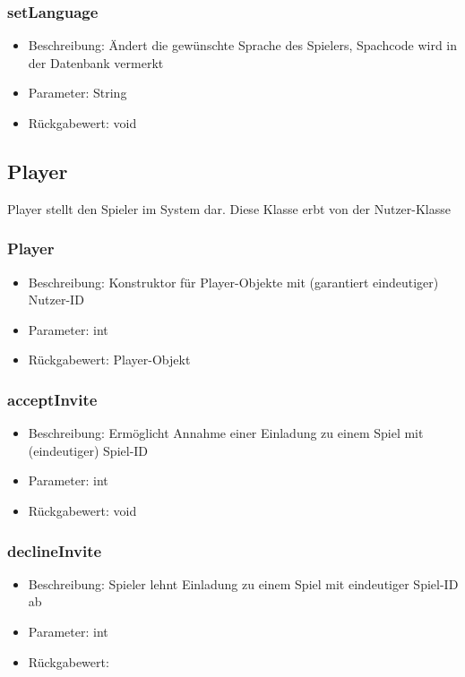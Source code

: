 \documentclass[a4paper]{scrreprt}
\begin{document}
    \subsubsection{setLanguage}
    \begin{itemize}
        \item Beschreibung: Ändert die gewünschte Sprache des Spielers, Spachcode wird in der Datenbank vermerkt
        \item Parameter: String
        \item Rückgabewert: void
    \end{itemize}

    \subsection{Player}
    Player stellt den Spieler im System dar. Diese Klasse erbt von der Nutzer-Klasse
    \subsubsection{Player}
    \begin{itemize}
        \item Beschreibung: Konstruktor für Player-Objekte mit (garantiert eindeutiger) Nutzer-ID
        \item Parameter: int
        \item Rückgabewert: Player-Objekt
    \end{itemize}
    \subsubsection{acceptInvite}
    \begin{itemize}
        \item Beschreibung: Ermöglicht Annahme einer Einladung zu einem Spiel mit (eindeutiger) Spiel-ID
        \item Parameter: int
        \item Rückgabewert: void
    \end{itemize}
    \subsubsection{declineInvite}
    \begin{itemize}
        \item Beschreibung: Spieler lehnt Einladung zu einem Spiel mit eindeutiger Spiel-ID ab
        \item Parameter: int
        \item Rückgabewert:
    \end{itemize}
\end{document}
